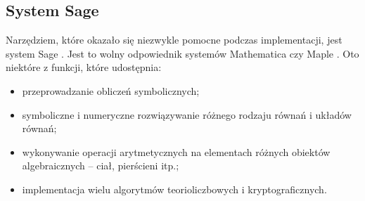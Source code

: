 \subsection*{System Sage}

Narzędziem, które okazało się niezwykle pomocne podczas implementacji,
jest system Sage \cite{sage}.
Jest to wolny odpowiednik systemów
Mathematica \cite{mathematica} czy Maple \cite{maple}.
Oto niektóre z funkcji, które udostępnia:
\begin{itemize}
\item
przeprowadzanie obliczeń symbolicznych;
\item
symboliczne i numeryczne rozwiązywanie
różnego rodzaju równań i układów równań;
\item
wykonywanie operacji arytmetycznych
na elementach różnych obiektów algebraicznych --
ciał, pierścieni itp.;
\item
implementacja wielu algorytmów teorioliczbowych i kryptograficznych.
\end{itemize}
